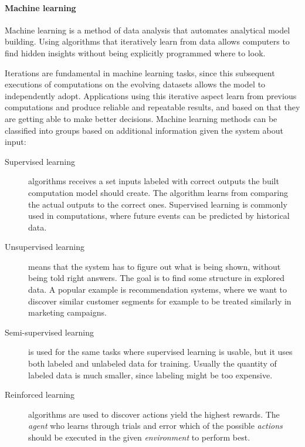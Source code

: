 \paragraph{Machine learning}
\begin{displayquote}
Machine learning\cite{ml}%
is a method of data analysis that automates analytical model building. Using algorithms that iteratively learn from data allows computers to find hidden insights without being explicitly programmed where to look.
\end{displayquote}
Iterations are fundamental in machine learning tasks, since this subsequent executions of computations on the evolving datasets allows the model to independently adopt. Applications using this iterative aspect learn from previous computations and produce reliable and repeatable results, and based on that they are getting able to make better decisions.
Machine learning methods\cite{ml}%
 can be classified into groups based on additional information given the system about input:
 
\begin{description}
\item[Supervised learning] algorithms receives a set inputs labeled with correct outputs the built computation model should create. The  algorithm learns from comparing the actual outputs to the correct ones. Supervised learning is commonly used in computations, where future events can be predicted by historical data. 
\item[Unsupervised learning] means that the system has to figure out what is being shown, without being told right answers. The goal is to find some structure in explored data. A popular example is recommendation systems, where we want to discover similar customer segments for example to be treated similarly in marketing campaigns.
\item[Semi-supervised learning] is used for the same tasks where supervised learning is usable, but it uses both labeled and unlabeled data for training. Usually the quantity of labeled data is much smaller, since labeling might be too expensive. 
\item[Reinforced learning] algorithms are used to discover actions yield the highest rewards. The {\textit{agent}} who learns through trials and error which of the possible {\textit{actions}} should be executed in the given {\textit{environment}} to perform best.
\end{description}

